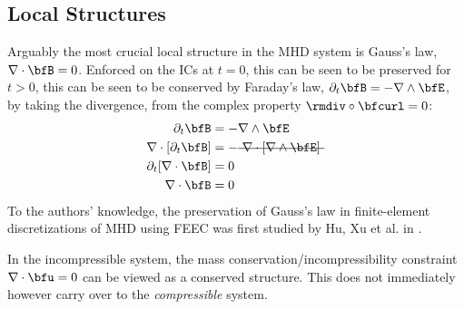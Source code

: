 \subsection*{Local Structures}
    Arguably the most crucial local structure in the MHD system is Gauss's law, $\nabla\cdot\bfB  =  0$. Enforced on the ICs at $t  =  0$, this can be seen to be preserved for $t  >  0$, this can be seen to be conserved by Faraday's law, $\partial_{t}\bfB  =  - \nabla\wedge\bfE$, by taking the divergence, from the complex property $\rmdiv\circ\bfcurl  =  0$: \cite{Stratton_1941, Rosen_1980, Freistühler_Warnecke_2002}
    \begin{align}
                    \partial_{t}\bfB   &=  - \nabla\wedge\bfE  \\
        \nabla\cdot[\partial_{t}\bfB]  &=  - \mst{\nabla\cdot[\nabla\wedge\bfE]}  \\
        \partial_{t}[\nabla\cdot\bfB]  &=  0  \\
                     \nabla\cdot\bfB   &=  0
    \end{align}
    To the authors' knowledge, the preservation of Gauss's law in finite-element discretizations of MHD using FEEC was first studied by Hu, Xu et al. in \cite{Hu_Xu_2015, Hu_Ma_Xu_2017}.

    \begin{remark}
        In the incompressible system, the mass conservation/incompressibility constraint $\nabla\cdot\bfu  =  0$ can be viewed as a conserved structure. This does not immediately however carry over to the \emph{compressible} system.
    \end{remark}
